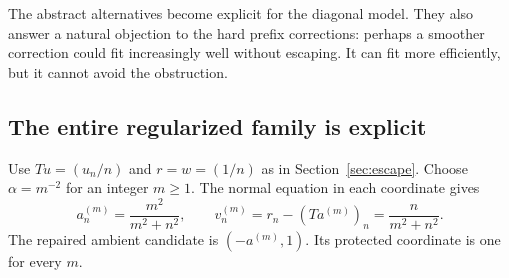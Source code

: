 \label{sec:diagonal-regularization}
The abstract alternatives become explicit for the diagonal model. They also answer a natural objection to the hard prefix corrections: perhaps a smoother correction could fit increasingly well without escaping. It can fit more efficiently, but it cannot avoid the obstruction.

\subsection{The entire regularized family is explicit}
Use $Tu=(u_n/n)$ and $r=w=(1/n)$ as in Section~\ref{sec:escape}. Choose $\alpha=m^{-2}$ for an integer $m\ge1$. The normal equation in each coordinate gives
\[
 a^{(m)}_n=\frac{m^2}{m^2+n^2},\qquad
 v^{(m)}_n=r_n-(Ta^{(m)})_n=\frac{n}{m^2+n^2}.
\]
The repaired ambient candidate is $(-a^{(m)},1)$. Its protected coordinate is one for every $m$.

